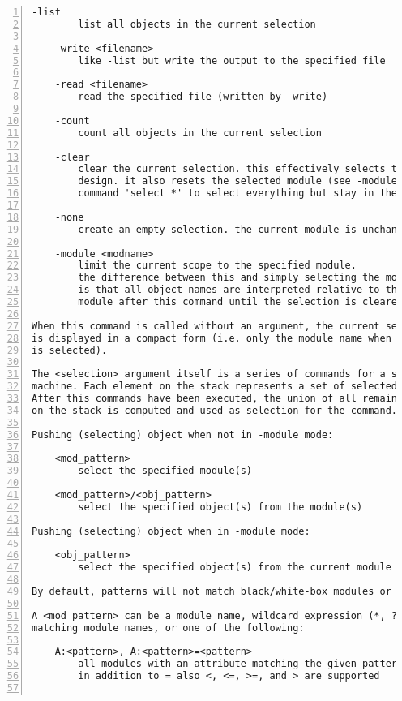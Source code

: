 \begin{lstlisting}[numbers=left,frame=single]
    -list
        list all objects in the current selection

    -write <filename>
        like -list but write the output to the specified file

    -read <filename>
        read the specified file (written by -write)

    -count
        count all objects in the current selection

    -clear
        clear the current selection. this effectively selects the whole
        design. it also resets the selected module (see -module). use the
        command 'select *' to select everything but stay in the current module.

    -none
        create an empty selection. the current module is unchanged.

    -module <modname>
        limit the current scope to the specified module.
        the difference between this and simply selecting the module
        is that all object names are interpreted relative to this
        module after this command until the selection is cleared again.

When this command is called without an argument, the current selection
is displayed in a compact form (i.e. only the module name when a whole module
is selected).

The <selection> argument itself is a series of commands for a simple stack
machine. Each element on the stack represents a set of selected objects.
After this commands have been executed, the union of all remaining sets
on the stack is computed and used as selection for the command.

Pushing (selecting) object when not in -module mode:

    <mod_pattern>
        select the specified module(s)

    <mod_pattern>/<obj_pattern>
        select the specified object(s) from the module(s)

Pushing (selecting) object when in -module mode:

    <obj_pattern>
        select the specified object(s) from the current module

By default, patterns will not match black/white-box modules or theircontents. To include such objects, prefix the pattern with '='.

A <mod_pattern> can be a module name, wildcard expression (*, ?, [..])
matching module names, or one of the following:

    A:<pattern>, A:<pattern>=<pattern>
        all modules with an attribute matching the given pattern
        in addition to = also <, <=, >=, and > are supported


\end{lstlisting}
